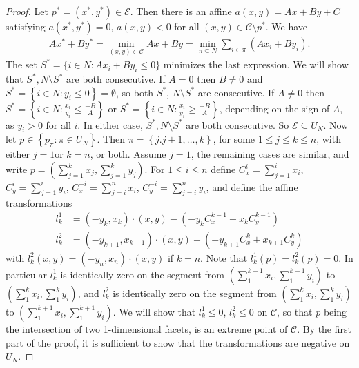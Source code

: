 \documentclass{article}
\theoremstyle{case}
\begin{document}
\begin{proof}
Let $p ^* = (x^*, y^*) \in \mathcal{E}$. Then there is an affine $a\left(x,y\right) = Ax + By + C$ satisfying $a(x^*, y^*) = 0$, $a(x,y) < 0$ for all $(x,y) \in \mathcal{C} \setminus p^*$.  We have
\begin{align}
Ax^* + By^* = \min_{(x,y) \in \mathcal{C}} Ax + By = \min_{\pi \subseteq N} \sum_{i \in \pi} (Ax_i + By_i).
\end{align}
The set $S^* = \{ i \in N: Ax_i + By_i \leq 0 \}$ minimizes the last expression. We will show that $S^*, N\setminus S^*$ are both consecutive. If $A = 0$ then $B \neq 0$ and $S^* =\left\lbrace i \in N \colon y_i \leq 0 \right\rbrace = \emptyset$, so both $S^*$, $N\setminus S^*$ are consecutive. If $ A \neq 0$ then $S^* = \left\lbrace i \in N \colon \frac{x_i}{y_i} \leq \frac{-B}{A} \right\rbrace$ or $S^* = \left\lbrace i \in N \colon \frac{x_i}{y_i} \geq \frac{-B}{A} \right\rbrace$, depending on the sign of $A$, as $y_i > 0$ for all $i$. In either case, $S^*, N\setminus S^*$ are both consecutive. So $\mathcal{E} \subseteq U_N$.
Now let $p \in \left\lbrace p_{\pi} \colon \pi \in U_N\right\rbrace$. Then $\pi = \left\lbrace j.j+1, \dots, k \right\rbrace$, for some $1 \leq j \leq k \leq n$, with either $j = 1$or $k = n$, or both. Assume $j = 1$, the remaining cases are similar, and write $p = \left( \sum_{j=1}^k x_j, \sum_{j=1}^k y_j\right)$. For $1 \leq i \leq n$ define $C_x^i = \sum_{j=1}^i x_i$, $C_y^i = \sum_{j=1}^i y_i$, $C_x^{-i} = \sum_{j=i}^n x_i$, $C_y^{-i} = \sum_{j=i}^n y_i$, and define the affine transformations
\begin{align*}
l_k^1 &= \left( -y_k, x_k\right) \cdot \left( x,y\right) - \left( -y_kC_x^{k-1} + x_kC_y^{k-1}\right) \\
l_k^2 &= \left( -y_{k+1}, x_{k+1}\right) \cdot \left( x,y\right) - \left( -y_{k+1}C_x^k + x_{k+1}C_y^k\right)
\end{align*}
with $l_k^2\left( x,y\right) = \left( -y_n, x_n\right) \cdot \left( x,y\right)$ if $k = n$. Note that $l_k^1\left( p\right) = l_k^2\left( p\right) = 0$. In particular $l_k^1$ is identically zero on the segment from $\left( \sum_1^{k-1} x_i, \sum_1^{k-1}y_i\right)$ to $\left( \sum_1^k x_i, \sum_1^k y_i\right)$, and $l_k^2$ is identically zero on the segment from $\left( \sum_1^k x_i, \sum_1^k y_i\right)$ to $\left( \sum_1^{k+1} x_i, \sum_1^{k+1}y_i\right)$. We will show that $l_k^1 \leq 0$, $l_k^2 \leq 0$ on $\mathcal{C}$, so that $p$ being the intersection of two 1-dimensional facets, is an extreme point of $\mathcal{C}$. By the first part of the proof, it is sufficient to show that the transformations are negative on $U_N$. 


\end{proof}
\end{document}
